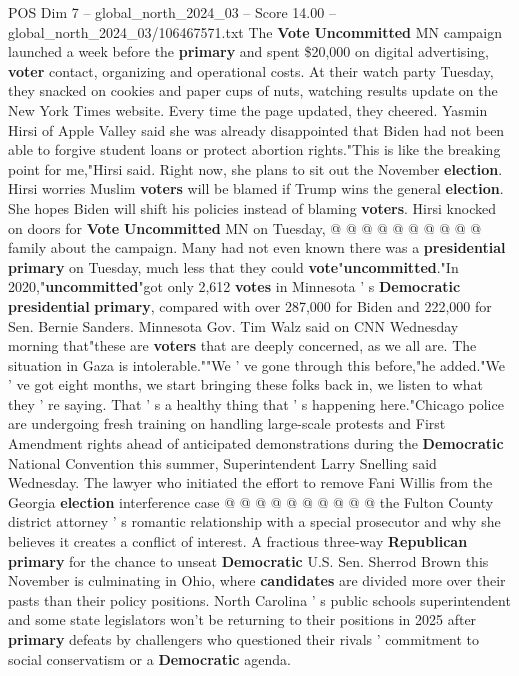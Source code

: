 \begin{textsample}{POS Dim 7 – global\_north\_2024\_03 – Score 14.00 – global\_north\_2024\_03/106467571.txt}
The \textbf{Vote} \textbf{Uncommitted} MN campaign launched a week before the \textbf{primary} and spent \$20,000 on digital advertising, \textbf{voter} contact, organizing and operational costs.
At their watch party Tuesday, they snacked on cookies and paper cups of nuts, watching results update on the New York Times website.
Every time the page updated, they cheered.
Yasmin Hirsi of Apple Valley said she was already disappointed that Biden had not been able to forgive student loans or protect abortion rights."This is like the breaking point for me,"Hirsi said.
Right now, she plans to sit out the November \textbf{election}.
Hirsi worries Muslim \textbf{voters} will be blamed if Trump wins the general \textbf{election}.
She hopes Biden will shift his policies instead of blaming \textbf{voters}.
Hirsi knocked on doors for \textbf{Vote} \textbf{Uncommitted} MN on Tuesday, @ @ @ @ @ @ @ @ @ @ family about the campaign.
Many had not even known there was a \textbf{presidential} \textbf{primary} on Tuesday, much less that they could \textbf{vote}"\textbf{uncommitted}."In 2020,"\textbf{uncommitted}"got only 2,612 \textbf{votes} in Minnesota ' s \textbf{Democratic} \textbf{presidential} \textbf{primary}, compared with over 287,000 for Biden and 222,000 for Sen.
Bernie Sanders.
Minnesota Gov.
Tim Walz said on CNN Wednesday morning that"these are \textbf{voters} that are deeply concerned, as we all are.
The situation in Gaza is intolerable.""We ' ve gone through this before,"he added."We ' ve got eight months, we start bringing these folks back in, we listen to what they ' re saying.
That ' s a healthy thing that ' s happening here."Chicago police are undergoing fresh training on handling large-scale protests and First Amendment rights ahead of anticipated demonstrations during the \textbf{Democratic} National Convention this summer, Superintendent Larry Snelling said Wednesday.
The lawyer who initiated the effort to remove Fani Willis from the Georgia \textbf{election} interference case @ @ @ @ @ @ @ @ @ @ the Fulton County district attorney ' s romantic relationship with a special prosecutor and why she believes it creates a conflict of interest.
A fractious three-way \textbf{Republican} \textbf{primary} for the chance to unseat \textbf{Democratic} U.S.
Sen.
Sherrod Brown this November is culminating in Ohio, where \textbf{candidates} are divided more over their pasts than their policy positions.
North Carolina ' s public schools superintendent and some state legislators won't be returning to their positions in 2025 after \textbf{primary} defeats by challengers who questioned their rivals ' commitment to social conservatism or a \textbf{Democratic} agenda.

\end{textsample}
